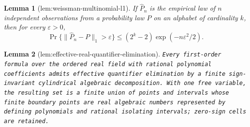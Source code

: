 \documentclass{article}
\newtheorem{lemma}{Lemma}
\begin{document}
\begin{lemma}[lem:weissman-multinomial-l1]\label{lem:weissman-multinomial-l1}
If \(\widehat P_n\) is the empirical law of \(n\) independent observations from a probability law \(P\) on an alphabet of cardinality \(k\), then for every \(\varepsilon>0\),
\[
 \Pr\{\|\widehat P_n-P\|_1>\varepsilon\}
 \le (2^k-2)\exp(-n\varepsilon^2/2).
\]
\end{lemma}

\begin{lemma}[lem:effective-real-quantifier-elimination]\label{lem:effective-real-quantifier-elimination}
\texttt{Every first-\allowbreak{}order formula over the ordered real field with rational polynomial coefficients admits effective quantifier elimination by a finite sign-\allowbreak{}invariant cylindrical algebraic decomposition.  With one free variable,\allowbreak{} the resulting set is a finite union of points and intervals whose finite boundary points are real algebraic numbers represented by defining polynomials and rational isolating intervals;\allowbreak{} zero-\allowbreak{}sign cells are retained.}
\end{lemma}
\end{document}
